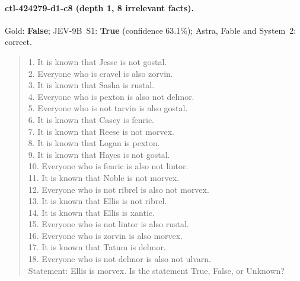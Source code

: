 \paragraph{ctl-424279-d1-c8 (depth 1, 8 irrelevant facts).} Gold: \textbf{False}; JEV-9B~S1: \textbf{True} (confidence 63.1\%); Astra, Fable and System~2: correct.
\begin{quote}\footnotesize 1. It is known that Jesse is not gostal. \\ 2. Everyone who is cravel is also zorvin. \\ 3. It is known that Sasha is rustal. \\ 4. Everyone who is pexton is also not delmor. \\ 5. Everyone who is not tarvin is also gostal. \\ 6. It is known that Casey is fenric. \\ 7. It is known that Reese is not morvex. \\ 8. It is known that Logan is pexton. \\ 9. It is known that Hayes is not gostal. \\ 10. Everyone who is fenric is also not lintor. \\ 11. It is known that Noble is not morvex. \\ 12. Everyone who is not ribrel is also not morvex. \\ 13. It is known that Ellis is not ribrel. \\ 14. It is known that Ellis is xantic. \\ 15. Everyone who is not lintor is also rustal. \\ 16. Everyone who is zorvin is also morvex. \\ 17. It is known that Tatum is delmor. \\ 18. Everyone who is not delmor is also not ulvarn. \\[2pt] Statement: Ellis is morvex. Is the statement True, False, or Unknown?\end{quote}
